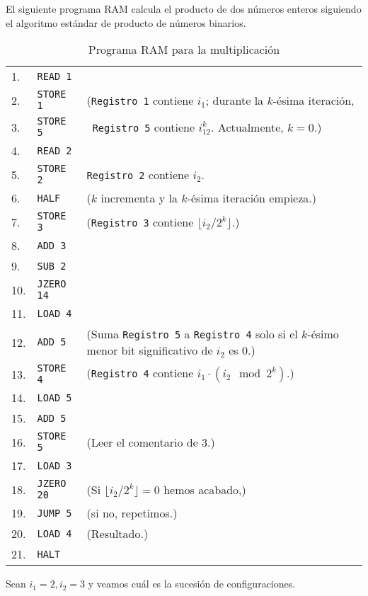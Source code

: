 \documentclass[twoside]{article}
\begin{document}
\newpage

\begin{ej}
El siguiente programa RAM calcula el producto de dos números enteros siguiendo el algoritmo estándar de producto de números binarios.
\begin{table}[h!]
\begin{tabular}{l l l}
1. & \texttt{READ 1} &\\
2. & \texttt{STORE 1} & (\texttt{Registro 1} contiene $i_1$; durante la $k$-ésima iteración,\\
3. & \texttt{STORE 5} & \ \texttt{Registro 5} contiene $i_12^k$. Actualmente, $k=0$.)\\
4. & \texttt{READ 2} & \\
5. & \texttt{STORE 2} & \texttt{Registro 2} contiene $i_2$. \\
6. & \texttt{HALF} & ($k$ incrementa y la $k$-ésima iteración empieza.)\\
7. & \texttt{STORE 3} & (\texttt{Registro 3} contiene $\lfloor i_2/2^k\rfloor$.)\\
8. & \texttt{ADD 3}  & \\
9. & \texttt{SUB 2}  & \\
10. & \texttt{JZERO 14} & \\
11. & \texttt{LOAD 4} &  \\
12. & \texttt{ADD 5} & (Suma \texttt{Registro 5} a \texttt{Registro 4} solo si el $k$-ésimo menor bit significativo de $i_2$ es 0.)\\
13. & \texttt{STORE 4} & (\texttt{Registro 4} contiene $i_1\cdot (i_2\mod 2^k)$.)\\
14. & \texttt{LOAD 5} & \\
15. & \texttt{ADD 5} & \\
16. & \texttt{STORE 5} & (Leer el comentario de 3.)\\
17. & \texttt{LOAD 3} & \\
18. & \texttt{JZERO 20} & (Si $\lfloor i_2/2^k\rfloor=0$ hemos acabado,)\\
19. & \texttt{JUMP 5} & (si no, repetimos.)\\
20. & \texttt{LOAD 4} & (Resultado.)\\
21. & \texttt{HALT} &
\end{tabular}
\caption{Programa RAM para la multiplicación}\label{mply}
\end{table}


Sean $i_1=2,i_2=3$ y veamos cuál es la sucesión de configuraciones.


\end{ej}
\end{document}
